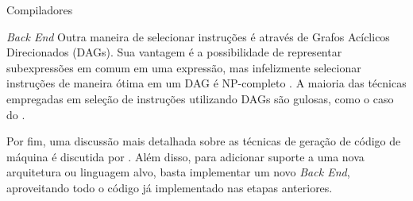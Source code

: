 \begin{section}{Compiladores}
\begin{subsection}{\textit{Back End}}
Outra maneira de selecionar instruções é através de Grafos Acíclicos
Direcionados (DAGs). Sua vantagem é a possibilidade de representar
subexpressões em comum em uma expressão, mas infelizmente selecionar instruções
de maneira ótima em um DAG é NP-completo \citep{koes2008near}.  A maioria das
técnicas empregadas em seleção de instruções utilizando DAGs são gulosas, como
o caso do \cite{llvm_insn_selection}.

Por fim, uma discussão mais detalhada sobre
as técnicas de geração de código de máquina é discutida por
\cite{blindell2016instruction}. Além disso, para
adicionar suporte a uma nova arquitetura ou linguagem
alvo, basta implementar um novo \textit{Back End}, aproveitando todo
o código já implementado nas etapas anteriores.

\end{subsection}


\end{section}


